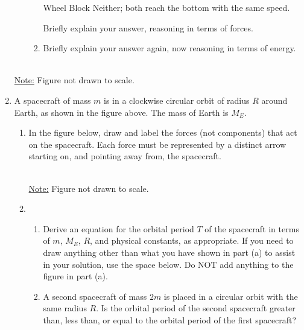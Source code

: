 \documentclass{../../../oss-apphys}
\begin{document}
\begin{enumerate}[leftmargin=15pt]
\begin{enumerate}[leftmargin=15pt,noitemsep]
\begin{enumerate}[leftmargin=15pt,noitemsep]
      \vspace{.1in}
      \underline{\hspace{.3in}} Wheel\hspace{.2in}
      \underline{\hspace{.3in}} Block\hspace{.2in}
      \underline{\hspace{.3in}} Neither; both reach the bottom with the same
      speed.

      \vspace{.1in}Briefly explain your answer, reasoning in terms of forces.
      
    \item Briefly explain your answer again, now reasoning in terms of energy.
    \end{enumerate}
  \end{enumerate}
  \vspace{1.5in}

  \begin{center}
    \\
    \underline{Note:} Figure not drawn to scale.
  \end{center}
\item A spacecraft of mass $m$ is in a clockwise circular orbit of radius $R$
  around Earth, as shown in the figure above. The mass of Earth is $M_E$.
  \begin{enumerate}[leftmargin=15pt,noitemsep]
  \item In the figure below, draw and label the forces (not components) that
    act on the spacecraft. Each force must be represented by a distinct arrow
    starting on, and pointing away from, the spacecraft.
    \begin{center}
      \\
      \underline{Note:} Figure not drawn to scale.
  \end{center}

  \item
    \begin{enumerate}[leftmargin=15pt,noitemsep]
    \item Derive an equation for the orbital period $T$ of the spacecraft in
      terms of $m$, $M_E$, $R$, and physical constants, as appropriate. If you
      need to draw anything other than what you have shown in part (a) to
      assist in your solution, use the space below. Do NOT add anything to the
      figure in part (a).
      \vspace{1in}
    \item A second spacecraft of mass $2m$ is placed in a circular orbit with
      the same radius $R$. Is the orbital period of the second spacecraft
      greater than, less than, or equal to the orbital period of the first
      spacecraft?


\end{enumerate}
\end{enumerate}
\end{enumerate}
\end{document}
